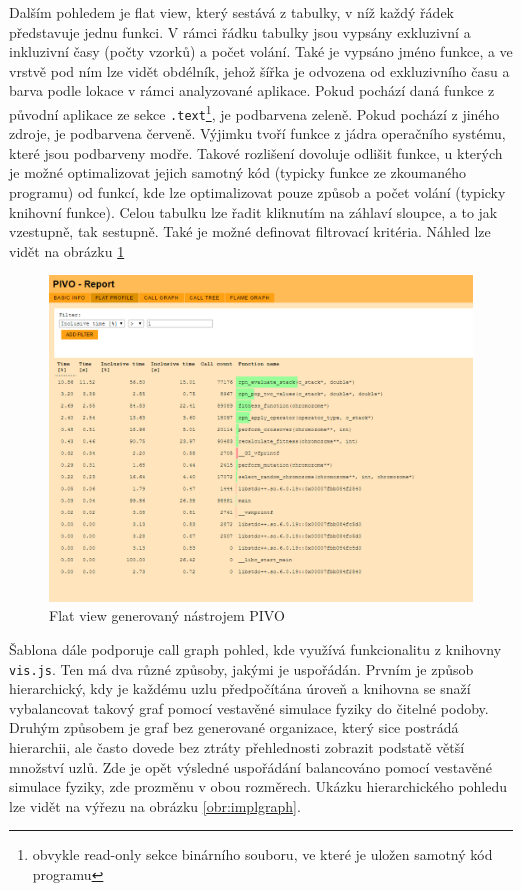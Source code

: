 \documentclass[czech,BP]{thesiskiv}
\begin{document}
Dalším pohledem je flat view, který sestává z tabulky, v níž každý řádek představuje jednu funkci. V rámci řádku tabulky jsou vypsány exkluzivní a inkluzivní časy (počty vzorků) a počet volání. Také je vypsáno jméno funkce, a ve vrstvě pod ním lze vidět obdélník, jehož šířka je odvozena od exkluzivního času a barva podle lokace v rámci analyzované aplikace. Pokud pochází daná funkce z původní aplikace ze sekce \texttt{.text}\footnote{obvykle read-only sekce binárního souboru, ve které je uložen samotný kód programu}, je podbarvena zeleně. Pokud pochází z jiného zdroje, je podbarvena červeně. Výjimku tvoří funkce z jádra operačního systému, které jsou podbarveny modře. Takové rozlišení dovoluje odlišit funkce, u kterých je možné optimalizovat jejich samotný kód (typicky funkce ze zkoumaného programu) od funkcí, kde lze optimalizovat pouze způsob a počet volání (typicky knihovní funkce). Celou tabulku lze řadit kliknutím na záhlaví sloupce, a to jak vzestupně, tak sestupně. Také je možné definovat filtrovací kritéria. Náhled lze vidět na obrázku \ref{obr:implflat}

\begin{figure}[h]
    \centering
    \includegraphics[interpolate,width=1.0\textwidth]{img/pivo_flat.png}
    \caption{Flat view generovaný nástrojem PIVO}
    \label{obr:implflat}
\end{figure}

Šablona dále podporuje call graph pohled, kde využívá funkcionalitu z knihovny \texttt{vis.js}. Ten má dva různé způsoby, jakými je uspořádán. Prvním je způsob hierarchický, kdy je každému uzlu předpočítána úroveň a knihovna se snaží vybalancovat takový graf pomocí vestavěné simulace fyziky do čitelné podoby. Druhým způsobem je graf bez generované organizace, který sice postrádá hierarchii, ale často dovede bez ztráty přehlednosti zobrazit podstatě větší množství uzlů. Zde je opět výsledné uspořádání balancováno pomocí vestavěné simulace fyziky, zde prozměnu v obou rozměrech. Ukázku hierarchického pohledu lze vidět na výřezu na obrázku \ref{obr:implgraph}.
\end{document}
